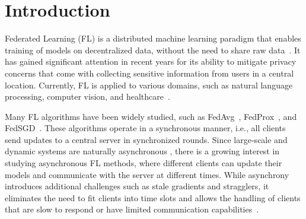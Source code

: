 \documentclass[nohyperref]{article}
\theoremstyle{plain}
\theoremstyle{definition}
\theoremstyle{remark}
\begin{document}

\section{Introduction}
\label{sec:introduction}

Federated Learning (FL) is a distributed machine learning paradigm that enables training of models on decentralized data, without the need to share raw data~\cite{communication_efficient}.
It has gained significant attention in recent years for its ability to mitigate privacy concerns that come with collecting sensitive information from users in a central location.
Currently, FL is applied to various domains, such as natural language processing, computer vision, and healthcare~\cite{advances_open_problems}.

Many FL algorithms have been widely studied, such as FedAvg~\cite{fedavg_conv_Li}, FedProx~\cite{fedprox}, and FedSGD~\cite{communication_efficient}.
These algorithms operate in a synchronous manner, i.e., all clients send updates to a central server in synchronized rounds.
Since large-scale and dynamic systems are naturally asynchronous \cite{async_hetero}, there is a growing interest in studying asynchronous FL methods, where different clients can update their models and communicate with the server at different times.
While asynchrony introduces additional challenges such as stale gradients and stragglers, it eliminates the need to fit clients into time slots and allows the handling of clients that are slow to respond or have limited communication capabilities~\cite{async_edge}.
\end{document}
